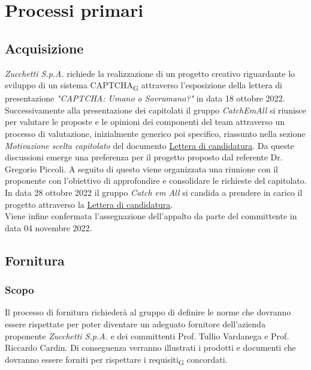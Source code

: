 \section{Processi primari}
\subsection{Acquisizione}
\textit{Zucchetti S.p.A.} richiede la realizzazione di un progetto creativo riguardante lo sviluppo di un sistema CAPTCHA\textsubscript{G} attraverso l'esposizione della lettera di presentazione \textit{"CAPTCHA: Umano o Sovrumano?"} in data 18 ottobre 2022.\\
Successivamente alla presentazione dei capitolati il gruppo \textit{CatchEmAll} si riunisce per valutare le proposte e le opinioni dei componenti del team attraverso un processo di valutazione, inizialmente generico poi specifico, riassunto nella sezione \textit{Motivazione scelta capitolato} del documento \href{https://github.com/catchEmAll-SWE/catchEmAll-Docs/blob/main/Assegnazione appalti/LetteraCandidatura.pdf}{Lettera di candidatura}. Da queste discussioni emerge una preferenza per il progetto proposto dal referente Dr. Gregorio Piccoli. 
A seguito di questo viene organizzata una riunione con il proponente con l'obiettivo di approfondire e consolidare le richieste del capitolato. \\ 
In data 28 ottobre 2022 il gruppo \textit{Catch em All} si candida a prendere in carico il progetto attraverso la \href{https://github.com/catchEmAll-SWE/Docs/blob/main/Assegnazione%20appalti/lettera_candidatura_v.1.0.0.pdf}{Lettera di candidatura}.\\
Viene infine confermata l'assegnazione dell'appalto da parte del committente in data 04 novembre 2022.


\subsection{Fornitura}
\subsubsection{Scopo}
Il processo di fornitura richiederà al gruppo di definire le norme che dovranno essere rispettate per poter diventare un adeguato fornitore dell'azienda proponente \textit{Zucchetti S.p.A.} e dei committenti Prof. Tullio Vardanega e Prof. Riccardo Cardin. Di conseguenza verranno illustrati i prodotti e documenti che dovranno essere forniti per rispettare i requisiti\textsubscript{G} concordati.
